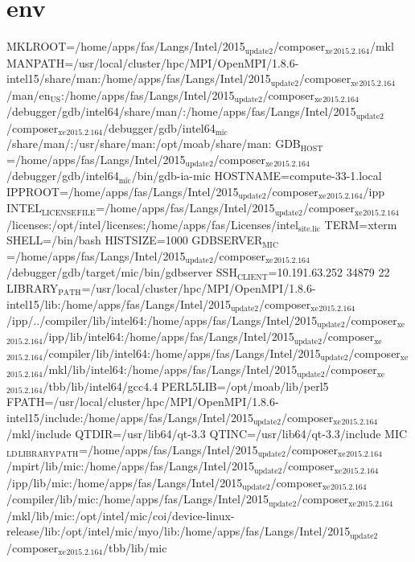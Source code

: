\documentclass[11pt]{article}
\begin{document}
\section{env}
\label{sec:orgdcddfe8}
MKLROOT=/home/apps/fas/Langs/Intel/2015\(_{\text{update2}}\)/composer\(_{\text{xe}}\)\(_{\text{2015.2.164}}\)/mkl
MANPATH=/usr/local/cluster/hpc/MPI/OpenMPI/1.8.6-intel15/share/man:/home/apps/fas/Langs/Intel/2015\(_{\text{update2}}\)/composer\(_{\text{xe}}\)\(_{\text{2015.2.164}}\)/man/en\(_{\text{US}}\):/home/apps/fas/Langs/Intel/2015\(_{\text{update2}}\)/composer\(_{\text{xe}}\)\(_{\text{2015.2.164}}\)/debugger/gdb/intel64/share/man/:/home/apps/fas/Langs/Intel/2015\(_{\text{update2}}\)/composer\(_{\text{xe}}\)\(_{\text{2015.2.164}}\)/debugger/gdb/intel64\(_{\text{mic}}\)/share/man/:/usr/share/man:/opt/moab/share/man:
GDB\(_{\text{HOST}}\)=/home/apps/fas/Langs/Intel/2015\(_{\text{update2}}\)/composer\(_{\text{xe}}\)\(_{\text{2015.2.164}}\)/debugger/gdb/intel64\(_{\text{mic}}\)/bin/gdb-ia-mic
HOSTNAME=compute-33-1.local
IPPROOT=/home/apps/fas/Langs/Intel/2015\(_{\text{update2}}\)/composer\(_{\text{xe}}\)\(_{\text{2015.2.164}}\)/ipp
INTEL\(_{\text{LICENSE}}\)\(_{\text{FILE}}\)=/home/apps/fas/Langs/Intel/2015\(_{\text{update2}}\)/composer\(_{\text{xe}}\)\(_{\text{2015.2.164}}\)/licenses:/opt/intel/licenses:/home/apps/fas/Licenses/intel\(_{\text{site.lic}}\)
TERM=xterm
SHELL=/bin/bash
HISTSIZE=1000
GDBSERVER\(_{\text{MIC}}\)=/home/apps/fas/Langs/Intel/2015\(_{\text{update2}}\)/composer\(_{\text{xe}}\)\(_{\text{2015.2.164}}\)/debugger/gdb/target/mic/bin/gdbserver
SSH\(_{\text{CLIENT}}\)=10.191.63.252 34879 22
LIBRARY\(_{\text{PATH}}\)=/usr/local/cluster/hpc/MPI/OpenMPI/1.8.6-intel15/lib:/home/apps/fas/Langs/Intel/2015\(_{\text{update2}}\)/composer\(_{\text{xe}}\)\(_{\text{2015.2.164}}\)/ipp/../compiler/lib/intel64:/home/apps/fas/Langs/Intel/2015\(_{\text{update2}}\)/composer\(_{\text{xe}}\)\(_{\text{2015.2.164}}\)/ipp/lib/intel64:/home/apps/fas/Langs/Intel/2015\(_{\text{update2}}\)/composer\(_{\text{xe}}\)\(_{\text{2015.2.164}}\)/compiler/lib/intel64:/home/apps/fas/Langs/Intel/2015\(_{\text{update2}}\)/composer\(_{\text{xe}}\)\(_{\text{2015.2.164}}\)/mkl/lib/intel64:/home/apps/fas/Langs/Intel/2015\(_{\text{update2}}\)/composer\(_{\text{xe}}\)\(_{\text{2015.2.164}}\)/tbb/lib/intel64/gcc4.4
PERL5LIB=/opt/moab/lib/perl5
FPATH=/usr/local/cluster/hpc/MPI/OpenMPI/1.8.6-intel15/include:/home/apps/fas/Langs/Intel/2015\(_{\text{update2}}\)/composer\(_{\text{xe}}\)\(_{\text{2015.2.164}}\)/mkl/include
QTDIR=/usr/lib64/qt-3.3
QTINC=/usr/lib64/qt-3.3/include
MIC\(_{\text{LD}}\)\(_{\text{LIBRARY}}\)\(_{\text{PATH}}\)=/home/apps/fas/Langs/Intel/2015\(_{\text{update2}}\)/composer\(_{\text{xe}}\)\(_{\text{2015.2.164}}\)/mpirt/lib/mic:/home/apps/fas/Langs/Intel/2015\(_{\text{update2}}\)/composer\(_{\text{xe}}\)\(_{\text{2015.2.164}}\)/ipp/lib/mic:/home/apps/fas/Langs/Intel/2015\(_{\text{update2}}\)/composer\(_{\text{xe}}\)\(_{\text{2015.2.164}}\)/compiler/lib/mic:/home/apps/fas/Langs/Intel/2015\(_{\text{update2}}\)/composer\(_{\text{xe}}\)\(_{\text{2015.2.164}}\)/mkl/lib/mic:/opt/intel/mic/coi/device-linux-release/lib:/opt/intel/mic/myo/lib:/home/apps/fas/Langs/Intel/2015\(_{\text{update2}}\)/composer\(_{\text{xe}}\)\(_{\text{2015.2.164}}\)/tbb/lib/mic
\end{document}
